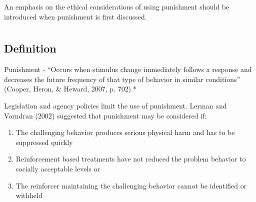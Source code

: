 An emphasis on the ethical considerations of using punishment should be introduced when punishment is first discussed.
%
%
%
%
%
%
%
\section[\fourdSeventeen{}]{\fourdSeventeen{}%
              }
\subsection{Definition}
Punishment - ``Occurs when stimulus change immediately follows a response and decreases the future frequency of that type of behavior in similar conditions'' (Cooper, Heron, \& Heward, 2007, p. 702).*

Legislation and agency policies limit the use of punishment. Lerman and Vorndran (2002) suggested that punishment may be considered if:
\begin{enumerate}
\item The challenging behavior produces serious physical harm and has to be suppressed quickly
\item Reinforcement based treatments have not reduced the problem behavior to socially acceptable levels or 
\item The reinforcer maintaining the challenging behavior cannot be identified or withheld 
\end{enumerate}

